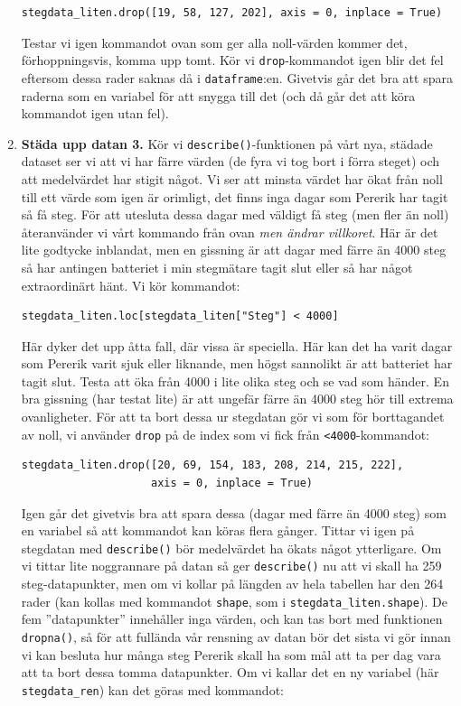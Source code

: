 \documentclass{article}
\begin{document}
\begin{enumerate}
\begin{verbatim}
stegdata_liten.drop([19, 58, 127, 202], axis = 0, inplace = True)
\end{verbatim}
Testar vi igen kommandot ovan som ger alla noll-värden kommer det, förhoppningsvis, komma upp tomt. Kör vi \verb+drop+-kommandot igen blir det fel eftersom dessa rader saknas då i \verb+dataframe+:en. Givetvis går det bra att spara raderna som en variabel för att snygga till det (och då går det att köra kommandot igen utan fel). 
\item \textbf{Städa upp datan 3.} Kör vi \verb+describe()+-funktionen på vårt nya, städade dataset ser vi att vi har färre värden (de fyra vi tog bort i förra steget) och att medelvärdet har stigit något. Vi ser att minsta värdet har ökat från noll till ett värde som igen är orimligt, det finns inga dagar som Pererik har tagit så få steg. För att utesluta dessa dagar med väldigt få steg (men fler än noll) återanvänder vi vårt kommando från ovan \emph{men ändrar villkoret}. Här är det lite godtycke inblandat, men en gissning är att dagar med färre än 4000 steg så har antingen batteriet i min stegmätare tagit slut eller så har något extraordinärt hänt. Vi kör kommandot:
\begin{verbatim}
stegdata_liten.loc[stegdata_liten["Steg"] < 4000]    
\end{verbatim}
Här dyker det upp åtta fall, där vissa är speciella. Här kan det ha varit dagar som Pererik varit sjuk eller liknande, men högst sannolikt är att batteriet har tagit slut. Testa att öka från 4000 i lite olika steg och se vad som händer. En bra gissning (har testat lite) är att ungefär färre än 4000 steg hör till extrema ovanligheter. För att ta bort dessa ur stegdatan gör vi som för borttagandet av noll, vi använder \verb+drop+ på de index som vi fick från \verb+<4000+-kommandot:
\begin{verbatim}
stegdata_liten.drop([20, 69, 154, 183, 208, 214, 215, 222], 
                    axis = 0, inplace = True)
\end{verbatim}
Igen går det givetvis bra att spara dessa (dagar med färre än 4000 steg) som en variabel så att kommandot kan köras flera gånger. Tittar vi igen på stegdatan med \verb+describe()+ bör medelvärdet ha ökats något ytterligare. Om vi tittar lite noggrannare på datan så ger \verb+describe()+ nu att vi skall ha 259 steg-datapunkter, men om vi kollar på längden av hela tabellen har den 264 rader (kan kollas med kommandot \verb+shape+, som i \texttt{stegdata_liten.shape}). De fem ”datapunkter” innehåller inga värden, och kan tas bort med funktionen \verb+dropna()+, så för att fullända vår rensning av datan bör det sista vi gör innan vi kan besluta hur många steg Pererik skall ha som mål att ta per dag vara att ta bort dessa tomma datapunkter. Om vi kallar det en ny variabel (här \verb+stegdata_ren+) kan det göras med kommandot:

\end{enumerate}
\end{document}

